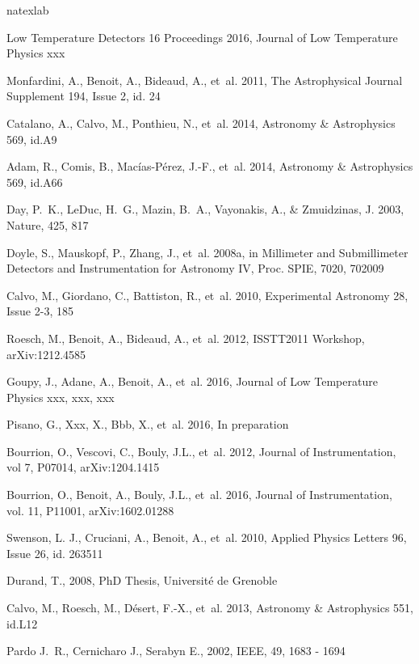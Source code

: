 \documentclass[]{aa} %
\begin{document}
\begin{thebibliography}{16}
\expandafter\ifx\csname natexlab\endcsname\relax\def\natexlab#1{#1}\fi

Low Temperature Detectors 16 Proceedings 2016,  Journal of Low
  Temperature Physics xxx

Monfardini, A., Benoit, A., Bideaud, A., {et~al.} 2011, 
The Astrophysical Journal Supplement 194, Issue 2, id. 24

Catalano, A., Calvo, M., Ponthieu, N., {et~al.} 2014, 
Astronomy \& Astrophysics 569, id.A9

Adam, R., Comis, B., Mac\'ias-P\'erez, J.-F., {et~al.} 2014, 
Astronomy \& Astrophysics 569, id.A66

Day, P.~K., LeDuc, H.~G., Mazin, B.~A., Vayonakis, A., \& Zmuidzinas, J. 2003,
  Nature, 425, 817

Doyle, S., Mauskopf, P., Zhang, J., {et~al.} 2008{\natexlab{a}}, in Millimeter
  and Submillimeter Detectors and Instrumentation for Astronomy IV, Proc. SPIE,
  7020, 702009

Calvo, M., Giordano, C., Battiston, R., {et~al.} 2010, 
Experimental Astronomy 28, Issue 2-3, 185

Roesch, M., Benoit, A., Bideaud, A., {et~al.} 2012, 
ISSTT2011 Workshop, arXiv:1212.4585

Goupy, J., Adane, A., Benoit, A., {et~al.} 2016, 
Journal of Low Temperature Physics xxx, xxx, xxx

Pisano, G., Xxx, X., Bbb, X., {et~al.} 2016, 
In preparation

Bourrion, O., Vescovi, C., Bouly, J.L., {et~al.} 2012, 
Journal of Instrumentation, vol 7, P07014, arXiv:1204.1415

Bourrion, O., Benoit, A., Bouly, J.L., {et~al.} 2016, 
Journal of Instrumentation, vol. 11, P11001, arXiv:1602.01288

Swenson, L. J., Cruciani, A., Benoit, A., {et~al.} 2010, 
Applied Physics Letters 96, Issue 26, id. 263511

Durand, T., 2008, 
PhD Thesis, Universit\' e de Grenoble

Calvo, M., Roesch, M., D\'esert, F.-X., {et~al.} 2013, 
Astronomy \& Astrophysics 551, id.L12

Pardo J.~R., Cernicharo J., Serabyn E., 2002, 
IEEE, 49, 1683 - 1694


\end{thebibliography}

%
% 
\end{document}
